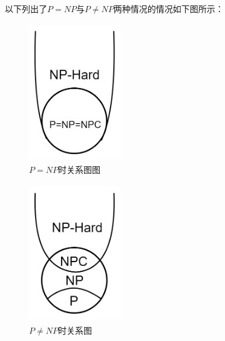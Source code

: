 以下列出了$P= NP$与$P\neq NP$两种情况的情况如下图所示：
	
	\begin{figure}[!htbp]
		\begin{minipage}[t]{1\linewidth}
			\centering
			\includegraphics[width=4cm,height=6cm]{image/P_NP4.png}
			\caption{$P= NP$时关系图图}
		\end{minipage}
	\end{figure}

		\begin{figure}[!htbp]
		\begin{minipage}[t]{1\linewidth}
			\centering
			\includegraphics[width=4cm,height=6cm]{image/P_NP5.png}
			\caption{$P\neq NP$时关系图}
		\end{minipage}
	\end{figure}
	
